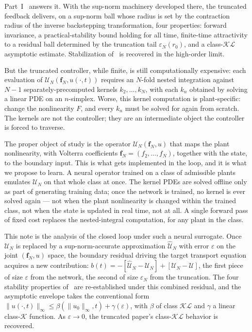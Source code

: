 \documentclass[twocolumn,amsthm]{autart}
\newcommand{\eps}{\varepsilon}
\theoremstyle{plain}
\theoremstyle{definition}
\begin{document}
Part~I~\cite{krstic2026feedbacklinearizationhyperbolicpdes-trunc} answers it. With the sup-norm machinery developed there, the truncated feedback delivers, on a sup-norm ball whose radius is set by the contraction radius of the inverse backstepping transformation, four properties: forward invariance, a practical-stability bound holding for all time, finite-time attractivity to a residual ball determined by the truncation tail $\eps_N(r_0)$, and a class-$\mathcal{KL}$ asymptotic estimate. Stabilization of~\cite{krstic2026feedbacklinearizationhyperbolicpdes} is recovered in the high-order limit.

But the truncated controller, while finite, is still computationally expensive: each evaluation of $\mathcal{U}_N(\mathbf{f}_N, u(\cdot,t))$ requires an $N$-fold nested integration against $N - 1$ separately-precomputed kernels $k_2, \ldots, k_N$, with each $k_n$ obtained by solving a linear PDE on an $n$-simplex. Worse, this kernel computation is plant-specific: change the nonlinearity $F$, and every $k_n$ must be solved for again from scratch. The kernels are not the controller; they are an intermediate object the controller is forced to traverse.

The proper object of study is the operator $\mathcal{U}_N(\mathbf{f}_N, u)$ that maps the plant nonlinearity, with Volterra coefficients $\mathbf{f}_N = (f_2, \ldots, f_N)$, together with the state, to the boundary input. This is what gets implemented in the loop, and it is what we propose to learn. A neural operator trained on a class of admissible plants emulates $\mathcal{U}_N$ on that whole class at once. The kernel PDEs are solved offline only as part of generating training data; once the network is trained, no kernel is ever solved again --- not when the plant nonlinearity is changed within the trained class, not when the state is updated in real time, not at all. A single forward pass of fixed cost replaces the nested-integral computation, for any plant in the class.

This note is the analysis of the closed loop under such a neural surrogate. Once $\mathcal{U}_N$ is replaced by a sup-norm-accurate approximation $\widehat{\mathcal{U}}_N$ with error $\eps$ on the joint $(\mathbf{f}_N, u)$ space, the boundary residual driving the target transport equation acquires a new contribution: $b(t) = -[\widehat{\mathcal{U}}_N - \mathcal{U}_N] + [\mathcal{U}_N - \mathcal{U}]$, the first piece of size $\eps$ from the network, the second of size $\eps_N$ from the truncation. The four stability properties of~\cite{krstic2026feedbacklinearizationhyperbolicpdes-trunc} are re-established under this combined residual, and the asymptotic envelope takes the conventional form $\|u(\cdot, t)\|_\infty \le \beta(\|u_0\|_\infty, t) + \gamma(\eps)$, with $\beta$ of class $\mathcal{KL}$ and $\gamma$ a linear class-$\mathcal{K}$ function. As $\eps \to 0$, the truncated paper's class-$\mathcal{KL}$ behavior is recovered.
\end{document}
